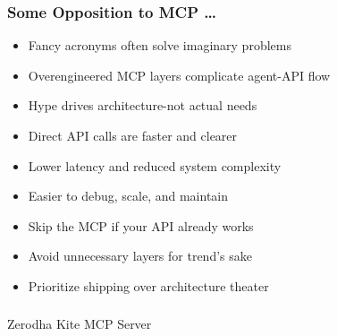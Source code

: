 \begin{frame}[fragile]\frametitle{Some Opposition to MCP \ldots}
    \begin{itemize}
        \item Fancy acronyms often solve imaginary problems
        \item Overengineered MCP layers complicate agent-API flow
        \item Hype drives architecture-not actual needs
        \item Direct API calls are faster and clearer
        \item Lower latency and reduced system complexity
        \item Easier to debug, scale, and maintain	
		\item Skip the MCP if your API already works
        \item Avoid unnecessary layers for trend's sake
        \item Prioritize shipping over architecture theater
    \end{itemize}
\end{frame}


\begin{frame}[fragile]\frametitle{}
\begin{center}
{\Large Zerodha Kite MCP Server}
\end{center}
\end{frame}
